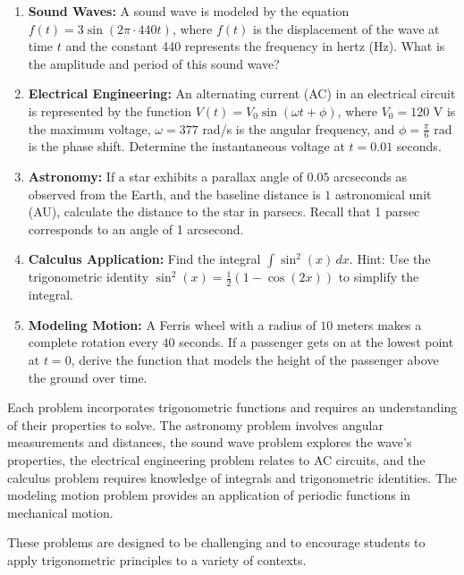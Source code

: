 \documentclass[a4paper,12pt]{book}
\newcounter{problem}
\begin{document}
\begin{enumerate}
    \item \textbf{Sound Waves:} A sound wave is modeled by the equation \( f(t) = 3 \sin(2\pi \cdot 440t) \), where \( f(t) \) is the displacement of the wave at time \( t \) and the constant 440 represents the frequency in hertz (Hz). What is the amplitude and period of this sound wave?
    
    \item \textbf{Electrical Engineering:} An alternating current (AC) in an electrical circuit is represented by the function \( V(t) = V_0 \sin(\omega t + \phi) \), where \( V_0 = 120 \) V is the maximum voltage, \( \omega = 377 \) rad/s is the angular frequency, and \( \phi = \frac{\pi}{6} \) rad is the phase shift. Determine the instantaneous voltage at \( t = 0.01 \) seconds.
    
    \item \textbf{Astronomy:} If a star exhibits a parallax angle of \( 0.05 \) arcseconds as observed from the Earth, and the baseline distance is \( 1 \) astronomical unit (AU), calculate the distance to the star in parsecs. Recall that 1 parsec corresponds to an angle of 1 arcsecond.
    
    \item \textbf{Calculus Application:} Find the integral \( \int \sin^2(x) \, dx \). Hint: Use the trigonometric identity \( \sin^2(x) = \frac{1}{2}(1 - \cos(2x)) \) to simplify the integral.
    
    \item \textbf{Modeling Motion:} A Ferris wheel with a radius of \( 10 \) meters makes a complete rotation every \( 40 \) seconds. If a passenger gets on at the lowest point at \( t = 0 \), derive the function that models the height of the passenger above the ground over time.
\end{enumerate}

Each problem incorporates trigonometric functions and requires an understanding of their properties to solve. The astronomy problem involves angular measurements and distances, the sound wave problem explores the wave's properties, the electrical engineering problem relates to AC circuits, and the calculus problem requires knowledge of integrals and trigonometric identities. The modeling motion problem provides an application of periodic functions in mechanical motion.

These problems are designed to be challenging and to encourage students to apply trigonometric principles to a variety of contexts.
\end{document}
